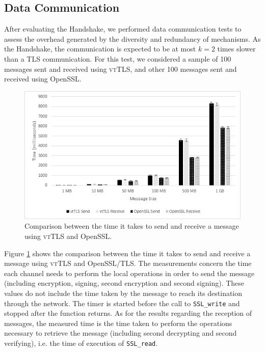 \documentclass{sig-alternate-05-2015}
\newcommand{\suite}[1]{\texttt{{\footnotesize #1}}}
\begin{document}


\subsection{Data Communication}

After evaluating the Handshake, we performed data communication tests to assess the overhead generated by the diversity and redundancy of mechanisms. As the Handshake, the communication is expected to be at most $k = 2$ times slower than a TLS communication.
For this test, we considered a sample of 100 messages sent and received using \textsc{vtTLS}, and other 100 messages sent and received using OpenSSL. 

\begin{figure}[t]
\includegraphics[width=\columnwidth]{eval_time_4_bw_IC}
\centering
\caption{Comparison between the time it takes to send and receive a message using \textsc{vtTLS} and OpenSSL.}
\label{fig:eval_time_2}
\end{figure}


Figure \ref{fig:eval_time_2} shows the comparison between the time it takes to send and receive a message using \textsc{vtTLS} and
OpenSSL/TLS.
The measurements concern the time each channel needs to perform the local operations in order to send the message (including encryption, signing, second encryption and second signing). These values do not include the time taken by the message to reach its destination through the network. The timer is started before the call to \suite{SSL\_write} and stopped after the function returns.
As for the results regarding the reception of messages, the measured time is the time taken to perform the operations necessary to retrieve the message (including second decrypting and second verifying), i.e. the time of execution of \suite{SSL\_read}.
\end{document}
